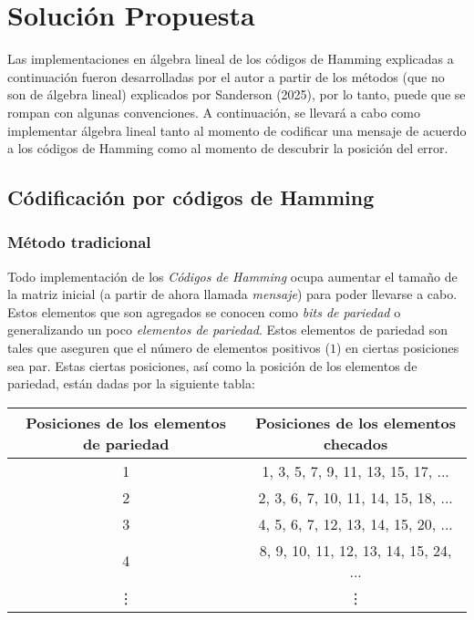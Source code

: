 \documentclass{article}
\begin{document}
\section{Solución Propuesta}

Las implementaciones en álgebra lineal de los códigos de Hamming explicadas a continuación fueron desarrolladas por el autor a partir de los métodos (que no son de álgebra lineal) explicados por Sanderson (2025), por lo tanto, puede que se rompan con algunas convenciones. A continuación, se llevará a cabo como implementar álgebra lineal tanto al momento de codificar una mensaje de acuerdo a los códigos de Hamming como al momento de descubrir la posición del error.

\subsection{Códificación por códigos de Hamming}

\subsubsection{Método tradicional}

Todo implementación de los \textit{Códigos de Hamming} ocupa aumentar el tamaño de la matriz inicial (a partir de ahora llamada \textit{mensaje}) para poder llevarse a cabo. Estos elementos que son agregados se conocen como \textit{bits de pariedad} o generalizando un poco \textit{elementos de pariedad}. Estos elementos de pariedad son tales que aseguren que el número de elementos positivos ($1$) en ciertas posiciones sea par. Estas ciertas posiciones, así como la posición de los elementos de pariedad, están dadas por la siguiente tabla:

\begin{center}
\begin{tabular}{ |c|c| } 
 \hline
 Posiciones de los elementos de pariedad & Posiciones de los elementos checados \\ 
 \hline
 1 & 1, 3, 5, 7, 9, 11, 13, 15, 17, ... \\ 
 2 & 2, 3, 6, 7, 10, 11, 14, 15, 18, ... \\ 
 3 & 4, 5, 6, 7, 12, 13, 14, 15, 20, ... \\
 4 & 8, 9, 10, 11, 12, 13, 14, 15, 24, ...\\
 \vdots & \vdots \\
 \hline
\end{tabular}
\end{center}
\end{document}
